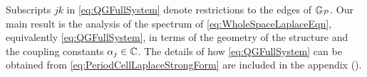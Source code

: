 Subscripts $jk$ in \eqref{eq:QGFullSystem} denote restrictions to the edges of $\mathbb{G}_{\mathcal{P}}$.
Our main result is the analysis of the spectrum of \eqref{eq:WholeSpaceLaplaceEqn}, equivalently \eqref{eq:QGFullSystem}, in terms of the geometry of the structure and the coupling constants $\alpha_j\in\mathbb{C}$.
The details of how \eqref{eq:QGFullSystem} can be obtained from \eqref{eq:PeriodCellLaplaceStrongForm} are included in the appendix ().
